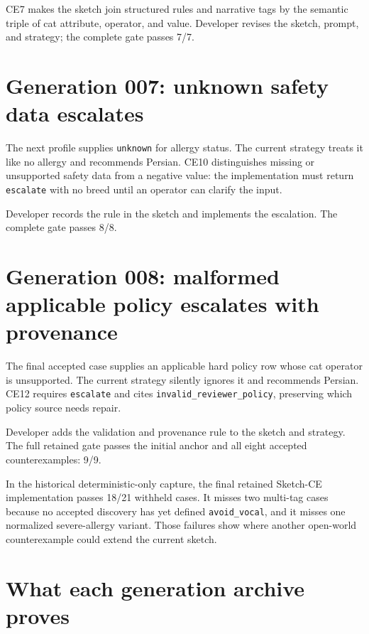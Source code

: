 CE7 makes the sketch join structured rules and narrative tags by the semantic triple of cat
attribute, operator, and value. Developer revises the sketch, prompt, and strategy; the complete
gate passes 7/7.

\section{Generation 007: unknown safety data escalates}\label{generation-007-unknown-safety-data-escalates}

The next profile supplies \texttt{unknown} for allergy status. The current strategy treats it like no
allergy and recommends Persian. CE10 distinguishes missing or unsupported safety data from a
negative value: the implementation must return \texttt{escalate} with no breed until an operator can
clarify the input.

Developer records the rule in the sketch and implements the escalation. The complete gate passes
8/8.

\section{Generation 008: malformed applicable policy escalates with provenance}\label{generation-008-malformed-applicable-policy-escalates-with-provenance}

The final accepted case supplies an applicable hard policy row whose cat operator is unsupported.
The current strategy silently ignores it and recommends Persian. CE12 requires \texttt{escalate} and
cites \texttt{invalid\_reviewer\_policy}, preserving which policy source needs repair.

Developer adds the validation and provenance rule to the sketch and strategy. The full retained
gate passes the initial anchor and all eight accepted counterexamples: 9/9.

In the historical deterministic-only capture, the final retained Sketch-CE implementation passes 18/21 withheld cases. It misses two multi-tag
cases because no accepted discovery has yet defined \texttt{avoid\_vocal}, and it misses one normalized
severe-allergy variant. Those failures show where another open-world counterexample could extend
the current sketch.

\section{What each generation archive proves}\label{what-each-generation-archive-proves}

